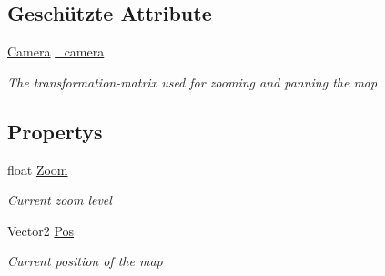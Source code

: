 \subsection*{Geschützte Attribute}
\begin{DoxyCompactItemize}
\item 
\hyperlink{class_gruppe22_1_1_client_1_1_camera}{Camera} \hyperlink{class_gruppe22_1_1_client_1_1_zoomable_aef967a0e7cd392b7d51c1b870f3b59be}{\-\_\-camera}
\begin{DoxyCompactList}\small\item\em The transformation-\/matrix used for zooming and panning the map \end{DoxyCompactList}\end{DoxyCompactItemize}
\subsection*{Propertys}
\begin{DoxyCompactItemize}
\item 
float \hyperlink{class_gruppe22_1_1_client_1_1_zoomable_a4a23fa2ceb4738621d6aaea5bd9fa72f}{Zoom}
\begin{DoxyCompactList}\small\item\em Current zoom level \end{DoxyCompactList}\item 
Vector2 \hyperlink{class_gruppe22_1_1_client_1_1_zoomable_aba34634a38c1290ec329919c711f31d1}{Pos}
\begin{DoxyCompactList}\small\item\em Current position of the map \end{DoxyCompactList}\end{DoxyCompactItemize}



